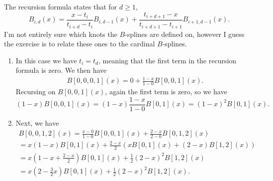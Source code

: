 \begin{solution}{3.5}
    The recursion formula states that for $d \geq 1$,
    \begin{equation*}
        B_{i, d}(x)
        = \frac{x - t_i}{t_{i+d} - t_i} B_{i, d-1}(x)
        + \frac{t_{i+d+1} - x}{t_{i+d+1} - t_{i+1}} B_{i+1, d-1}(x).
    \end{equation*}
    I'm not entirely sure which knots the $B$-splines are defined on, however I guess the exercise is to relate these ones to the cardinal $B$-splines.

    \begin{enumerate}[
    label=\alph*) %
            ] %
        \item In this case we have $t_i = t_d$, meaning that the first term in the recursion formula is zero.
            We then have
            \begin{align*}
                B[0, 0, 0, 1](x)
                = 0 + \frac{1 - x}{1 - 0} B[0, 0, 1](x).
            \end{align*}
            Recursing on $B[0, 0, 1](x)$, again the first term is zero, so we have
            \begin{equation*}
                (1 - x)B[0, 0, 1](x)
                = (1-x) \frac{1 - x}{1 - 0} B[0, 1](x)
                = (1 - x)^2 B[0, 1](x).
            \end{equation*}

        \item Next, we have
            \begin{gather*}
                B[0, 0, 1, 2](x)
                = \frac{x - 0}{1 - 0} B[0, 0, 1](x)
                + \frac{2 - x}{2 - 0} B[0, 1, 2](x) \\
                = x (1 - x) B[0, 1](x)
                + \frac{2 - x}{2} \left(
                    x B[0, 1](x)
                    + (2 - x) B[1, 2](x)
                \right) \\
                = x \left( 1 - x + \frac{2 - x}{2} \right) B[0, 1](x)
                + \frac{1}{2}(2 - x)^2 B[1, 2](x) \\
                = x \left( 2 - \frac{3}{2}x \right) B[0, 1](x)
                + \frac{1}{2}(2 - x)^2 B[1, 2](x).
            \end{gather*}


\end{enumerate}
\end{solution}
